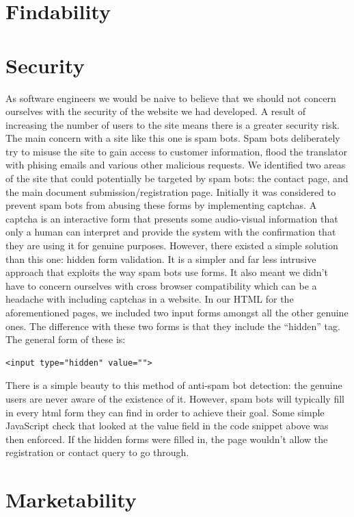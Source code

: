 \documentclass{l3proj}
\begin{document}
\section{Findability}
\section{Security}
As software engineers we would be naive to believe that we should not concern ourselves with the
security of the website we had developed. A result of increasing the number of users to the site
means there is a greater security risk. The main concern with a site like this one is spam bots.
Spam bots deliberately try to misuse the site to gain access to customer information, flood the 
translator with phising emails and various other malicious requests.\newline
We identified two areas of the site that could potentially be targeted by spam bots: the contact
page, and the main document submission/registration page. Initially it was considered to prevent 
spam bots from abusing these forms by implementing captchas. A captcha is an interactive form that
presents some audio-visual information that only a human can interpret and provide the system with 
the confirmation that they are using it for genuine purposes. However, there existed a simple 
solution than this one: hidden form validation. It is a simpler and far less intrusive approach that
exploits the way spam bots use forms. It also meant we didn't have to concern ourselves with 
cross browser compatibility which can be a headache with including captchas in a website. In our HTML
for the aforementioned pages, we included two input forms amongst all the other genuine ones. The 
difference with these two forms is that they include the ``hidden'' tag. The general form of these is:
\begin{lstlisting} 
<input type="hidden" value="">
\end{lstlisting}
There is a simple beauty to this method of anti-spam bot detection: the genuine users are never aware of the
existence of it. However, spam bots will typically fill in every html form they can find in order
to achieve their goal. Some simple JavaScript check that looked at the value field in the code snippet above
was then enforced. If the hidden forms were filled in, the page wouldn't allow the registration or contact 
query to go through. 
\section{Marketability}
\end{document}
